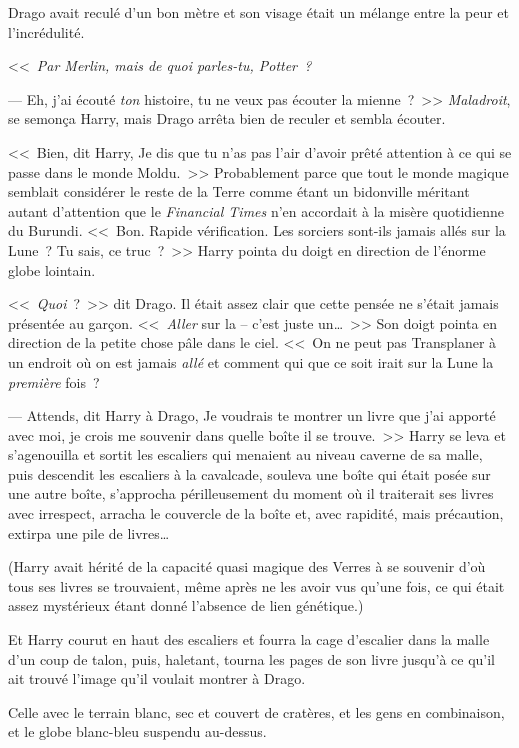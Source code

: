 Drago avait reculé d'un bon mètre et son visage était un mélange entre la peur et l'incrédulité.

<<~\emph{Par Merlin, mais de quoi parles-tu, Potter~?}

--- Eh, j'ai écouté \emph{ton} histoire, tu ne veux pas écouter la mienne~?~>> \emph{Maladroit}, se semonça Harry, mais Drago arrêta bien de reculer et sembla écouter.

<<~Bien, dit Harry, Je dis que tu n'as pas l'air d'avoir prêté attention à ce qui se passe dans le monde Moldu.~>> Probablement parce que tout le monde magique semblait considérer le reste de la Terre comme étant un bidonville méritant autant d'attention que le \emph{Financial Times} n'en accordait à la misère quotidienne du Burundi. <<~Bon. Rapide vérification. Les sorciers sont-ils jamais allés sur la Lune~? Tu sais, ce truc~?~>> Harry pointa du doigt en direction de l'énorme globe lointain.

<<~\emph{Quoi}~?~>> dit Drago. Il était assez clair que cette pensée ne s'était jamais présentée au garçon. <<~\emph{Aller} sur la -- c'est juste un…~>> Son doigt pointa en direction de la petite chose pâle dans le ciel. <<~On ne peut pas Transplaner à un endroit où on est jamais \emph{allé} et comment qui que ce soit irait sur la Lune la \emph{première} fois~?

--- Attends, dit Harry à Drago, Je voudrais te montrer un livre que j'ai apporté avec moi, je crois me souvenir dans quelle boîte il se trouve.~>> Harry se leva et s'agenouilla et sortit les escaliers qui menaient au niveau caverne de sa malle, puis descendit les escaliers à la cavalcade, souleva une boîte qui était posée sur une autre boîte, s'approcha périlleusement du moment où il traiterait ses livres avec irrespect, arracha le couvercle de la boîte et, avec rapidité, mais précaution, extirpa une pile de livres…

(Harry avait hérité de la capacité quasi magique des Verres à se souvenir d'où tous ses livres se trouvaient, même après ne les avoir vus qu'une fois, ce qui était assez mystérieux étant donné l'absence de lien génétique.)

Et Harry courut en haut des escaliers et fourra la cage d'escalier dans la malle d'un coup de talon, puis, haletant, tourna les pages de son livre jusqu'à ce qu'il ait trouvé l'image qu'il voulait montrer à Drago.

Celle avec le terrain blanc, sec et couvert de cratères, et les gens en combinaison, et le globe blanc-bleu suspendu au-dessus.

